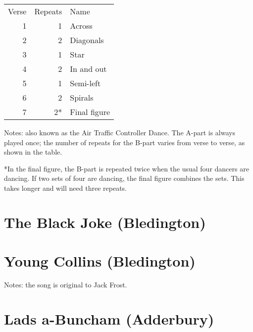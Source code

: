 \documentclass[12pt,a4paper]{article}
\begin{document}

\begin{minipage}[t]{6cm}
\vspace{0pt}
\begin{tabular}{rrl}
Verse & Repeats & Name \\
1 & 1 & Across \\
2 & 2 & Diagonals \\
3 & 1 & Star \\
4 & 2 & In and out \\
5 & 1 & Semi-left \\
6 & 2 & Spirals \\
7 & 2* & Final figure
\end{tabular}
\end{minipage} \hspace{3mm} \begin{minipage}[t]{10cm}
\vspace{0pt}
\noindent Notes: also known as the Air Traffic Controller Dance.
The A-part is always played once; the number of repeats for the
B-part varies from verse to verse, as shown in the table.

\smallskip

*In the final figure, the B-part is repeated twice when the usual four
dancers are dancing.  If two sets of four are dancing, the final
figure combines the sets. This takes longer and will need three
repeats.
\end{minipage}
\pagebreak[1]

\section{The Black Joke (Bledington)}


\pagebreak[1]

\section{Young Collins (Bledington)}


\noindent Notes: the song is original to Jack Frost.

\pagebreak[2]

\section{Lads a-Buncham (Adderbury)}
\end{document}
